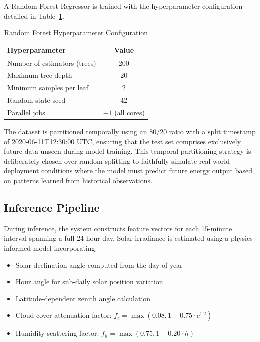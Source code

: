 \documentclass[conference]{IEEEtran}
\renewcommand{\small}{\fontsize{10}{14}\selectfont}
\begin{document}
A Random Forest Regressor is trained with the hyperparameter configuration detailed in Table~\ref{tab:hyperparams}.

\begin{table}[H]
\caption{Random Forest Hyperparameter Configuration}
\begin{center}
\small
\begin{tabular}{|l|c|}
\hline
\textbf{Hyperparameter} & \textbf{Value} \\
\hline
Number of estimators (trees) & 200 \\
\hline
Maximum tree depth & 20 \\
\hline
Minimum samples per leaf & 2 \\
\hline
Random state seed & 42 \\
\hline
Parallel jobs & $-1$ (all cores) \\
\hline
\end{tabular}
\label{tab:hyperparams}
\end{center}
\end{table}

The dataset is partitioned temporally using an 80/20 ratio with a split timestamp of 2020-06-11T12:30:00 UTC, ensuring that the test set comprises exclusively future data unseen during model training. This temporal partitioning strategy is deliberately chosen over random splitting to faithfully simulate real-world deployment conditions where the model must predict future energy output based on patterns learned from historical observations.

\subsection{Inference Pipeline}

During inference, the system constructs feature vectors for each 15-minute interval spanning a full 24-hour day. Solar irradiance is estimated using a physics-informed model incorporating:

\begin{itemize}
\item Solar declination angle computed from the day of year
\item Hour angle for sub-daily solar position variation
\item Latitude-dependent zenith angle calculation
\item Cloud cover attenuation factor: $f_c = \max(0.08, 1 - 0.75 \cdot c^{1.2})$
\item Humidity scattering factor: $f_h = \max(0.75, 1 - 0.20 \cdot h)$
\end{itemize}
\end{document}
